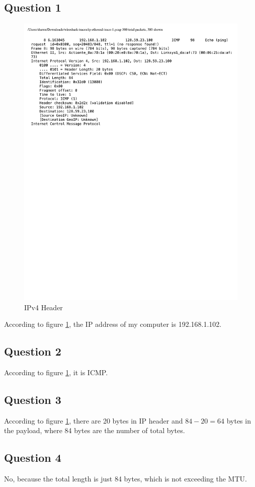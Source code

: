 \documentclass[titlepage, paper=a4, fontsize=11pt]{scrartcl} %
\numberwithin{equation}{section} %
\numberwithin{figure}{section} %
\numberwithin{table}{section} %
\begin{document}
\subsection*{Question 1}
\begin{figure}[!ht]
    \centering
    \includegraphics[width=\textwidth]{images/lab2-q1.pdf}
    \caption{IPv4 Header}
    \label{fig:ip-header}
\end{figure}
According to figure \ref{fig:ip-header}, the IP address of my computer is 192.168.1.102. \\

\subsection*{Question 2}
According to figure \ref{fig:ip-header}, it is ICMP. \\

\subsection*{Question 3}
According to figure \ref{fig:ip-header}, there are 20 bytes in IP header and $84-20=64$ bytes in the payload, where 84 bytes are the number of total bytes. \\

\subsection*{Question 4}
No, because the total length is just 84 bytes, which is not exceeding the MTU. \\
\end{document}
